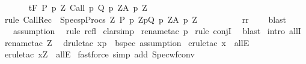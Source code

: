 \begin{isabellebody}
\ \ \ {\isasymLongrightarrow}\isanewline
\ \ \ {\isasymGamma}{\isacharcomma}{\isasymTheta}{\isasymturnstile}\isactrlsub t\isactrlbsub {\isacharslash}F\isactrlesub \ {\isacharparenleft}P\ p\ Z{\isacharparenright}\ {\isacharparenleft}Call\ p{\isacharparenright}\ {\isacharparenleft}Q\ p\ Z{\isacharparenright}{\isacharcomma}{\isacharparenleft}A\ p\ Z{\isacharparenright}{\isachardoublequoteclose}\isanewline
%
\isadelimproof
%
\endisadelimproof
%
\isatagproof
{}\isamarkupfalse%
\ {\isacharparenleft}rule\ CallRec\ {\isacharbrackleft}\ Specs{\isacharequal}{\isachardoublequoteopen}{\isasymUnion}p{\isasymin}Procs{\isachardot}\ {\isasymUnion}Z{\isachardot}\ {\isacharbraceleft}{\isacharparenleft}{\isacharparenleft}P\ p\ Z{\isacharparenright}{\isacharcomma}p{\isacharcomma}Q\ p\ Z{\isacharcomma}A\ p\ Z{\isacharparenright}{\isacharbraceright}{\isachardoublequoteclose}\ \isanewline
\ \ \ \ \ \ \ \ \ r{\isacharequal}r{\isacharbrackright}{\isacharparenright}\isanewline
{}\isamarkupfalse%
\ \ \ \ blast\isanewline
{}\isamarkupfalse%
\ \ \ assumption\isanewline
{}\isamarkupfalse%
\ \ {\isacharparenleft}rule\ refl{\isacharparenright}\isanewline
{}\isamarkupfalse%
\ {\isacharparenleft}clarsimp{\isacharparenright}\isanewline
{}\isamarkupfalse%
\ {\isacharparenleft}rename{\isacharunderscore}tac\ p{\isacharprime}{\isacharparenright}\isanewline
{}\isamarkupfalse%
\ {\isacharparenleft}rule\ conjI{\isacharparenright}\isanewline
{}\isamarkupfalse%
\ \ blast\isanewline
{}\isamarkupfalse%
\ {\isacharparenleft}intro\ allI{\isacharparenright}\isanewline
{}\isamarkupfalse%
\ {\isacharparenleft}rename{\isacharunderscore}tac\ Z\ {\isasymtau}{\isacharparenright}\isanewline
{}\isamarkupfalse%
\ {\isacharparenleft}drule{\isacharunderscore}tac\ x{\isacharequal}p{\isacharprime}\ \ bspec{\isacharcomma}\ assumption{\isacharparenright}\isanewline
{}\isamarkupfalse%
\ {\isacharparenleft}erule{\isacharunderscore}tac\ x{\isacharequal}{\isasymtau}\ \ allE{\isacharparenright}\isanewline
{}\isamarkupfalse%
\ {\isacharparenleft}erule{\isacharunderscore}tac\ x{\isacharequal}Z\ \ allE{\isacharparenright}\isanewline
{}\isamarkupfalse%
\ {\isacharparenleft}fastforce\ simp\ add{\isacharcolon}\ Spec{\isacharunderscore}wf{\isacharunderscore}conv{\isacharparenright}\isanewline
{}\isamarkupfalse%
%
\endisatagproof
{\isafoldproof}%
%
\isadelimproof
\isanewline
%
\endisadelimproof
%
\isadelimtheory
\isanewline
%
\endisadelimtheory
%
\isatagtheory
{}\isamarkupfalse%
%
\endisatagtheory
{\isafoldtheory}%
%
\isadelimtheory
%
\endisadelimtheory
%
\end{isabellebody}%
